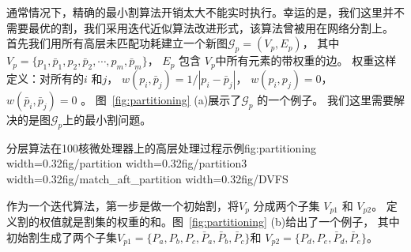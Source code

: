 通常情况下，精确的最小割算法开销太大不能实时执行。幸运的是，我们这里并不需要最优的割，我们采用迭代近似算法改进形式，该算法曾被用在网络分割上。
首先我们用所有高层未匹配功耗建立一个新图$\mathcal{G}_p = (V_p, E_p)$，
其中 $V_p=\{p_1, \bar{p}_1, p_2, \bar{p}_2, \cdots, p_m, \bar{p}_m\}$， 
$E_p$ 包含 $V_p$中所有元素的带权重的边。
权重这样定义：对所有的$i$ 和$j$， $w(p_i, \bar{p}_j) = 1/|p_i-\bar{p}_j|$，
$w(p_i, p_j) = 0$， $w(\bar{p}_i, \bar{p}_j) = 0$  。
图~\ref{fig:partitioning} (a)展示了$\mathcal{G}_p$ 的一个例子。 
我们这里需要解决的是图$\mathcal{G}_p$上的最小割问题。 

\begin{pics}{分层算法在100核微处理器上的高层处理过程示例}{fig:partitioning}
  \centering
  {width=0.32\columnwidth}{fig/partition}
  {width=0.32\columnwidth}{fig/partition3}
  {width=0.32\columnwidth}{fig/match_aft_partition}
  {width=0.32\columnwidth}{fig/DVFS}
\end{pics}

作为一个迭代算法，第一步是做一个初始割，将$V_p$ 分成两个子集 $V_{p1}$ 和 $V_{p2}$。
定义割的权值就是割集的权重的和。图~\ref{fig:partitioning} (b)给出了一个例子，
其中初始割生成了两个子集$V_{p1}=\{P_a, P_b, P_c, \bar{P}_a,
  \bar{P}_b, \bar{P}_c\}$和 $V_{p2}=\{P_d, P_e, \bar{P}_d,
  \bar{P}_e\}$。
  
